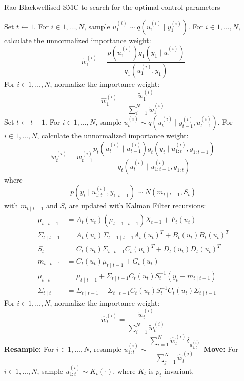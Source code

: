 \begin{algorithm}
\caption{Rao-Blackwellised SMC to search for the optimal control parameters}\label{algo:msmc}
\begin{algorithmic}[1]
\State Set $t \gets 1$.
\State For $i \in 1, \ldots, N$, sample $u^{(i)}_1 \sim q(u^{(i)}_1 \mid y^{(i)}_1)$.
\State For $i \in 1, \ldots, N$, calculate the unnormalized importance weight:
\begin{equation*}
 \tilde{w}^{(i)}_1 = \dfrac{p(u_1^{(i)})g_1(y_1 \mid u^{(i)}_1)}{q_1(u^{(i)}_1, y_1)}
\end{equation*}
\State For $i \in 1, \ldots, N$, normalize the importance weight:
\begin{equation*}
\hat{w}^{(i)}_1 = \dfrac{\tilde{w}^{(i)}_1}{\sum^N_{i=1} \tilde{w}^{(i)}_1}
\end{equation*}
\State Set $t \gets t + 1$.
\State For $i \in 1, \ldots, N$, sample $u^{(i)}_t \sim q(u^{(i)}_t \mid y^{(i)}_{t-1}, u^{(i)}_{t-1})$.
\State For $i \in 1, \ldots, N$, calculate the unnormalized importance weight:
\begin{equation*}
   \tilde{w}^{(i)}_t = w^{(i)}_{t-1} \dfrac{p_t(u^{(i)}_t \mid u^{(i)}_{t-1})g_t(y_t \mid u^{(i)}_{1:t}, y_{1:t-1})}{q_t(u^{(i)}_t \mid u^{(i)}_{1:t-1}, y_{1:t})}
\end{equation*}
where
\begin{equation}
  p(y_t \mid u^{(i)}_{1:t}, y_{1:t-1}) \sim N(m_{t \mid t-1},S_t)
\end{equation}
with $m_{t \mid t-1}$ and $S_t$ are updated with Kalman Filter recursions:
\begin{align}
  \mu_{t \mid t -1} &= A_{t}(u_t)(\mu_{t-1 \mid t-1})X_{t-1} + F_t(u_t) \nonumber \\
  \Sigma_{t \mid t -1} &= A_{t}(u_t)\Sigma_{t -1 \mid t -1}A_{t}(u_t)^T +  B_t(u_t)B_t(u_t)^T \nonumber\\
  S_t &=  C_{t}(u_t)\Sigma_{t \mid t -1}C_{t}(u_t)^T +  D_t(u_t)D_t(u_t)^T \nonumber\\
  m_{t \mid t-1} &=  C_{t}(u_t)  \mu_{t \mid t-1} + G_t(u_t) \nonumber\\
  \mu_{t \mid t} &=   \mu_{t \mid t -1} +   \Sigma_{t \mid t -1} C_{t}(u_t)S_t^{-1}(y_t - m_{t \mid t-1}) \nonumber\\
  \Sigma_{t \mid t} &=  \Sigma_{t \mid t -1} -\Sigma_{t \mid t -1} C_{t}(u_t)S_t^{-1} C_{t}(u_t)\Sigma_{t \nonumber \mid t -1}
\end{align}
\State For $i \in 1, \ldots, N$, normalize the importance weight:
\begin{equation*}
\hat{w}^{(i)}_t = \dfrac{\tilde{w}^{(i)}_t}{\sum^N_{i=1} \tilde{w}^{(i)}_t}
\end{equation*}
\State \textbf{Resample:} For $i \in 1, \ldots, N$, resample $ u^{(i)}_{1:t} \sim \dfrac{\sum^N_{i=1}\hat{w}^{(i)}_t\delta_{u^{(i)}_{1:t}}}{\sum^N_{j=1} \hat{w}^{(j)}_t}$
\State \textbf{Move:} For $i \in 1, \ldots, N$, sample $u^{(i)}_{1:t} \sim K_t(\cdot)$, where $K_t$ is $p_t$-invariant.
\EndWhile
\EndFunction
\end{algorithmic}
\end{algorithm}

